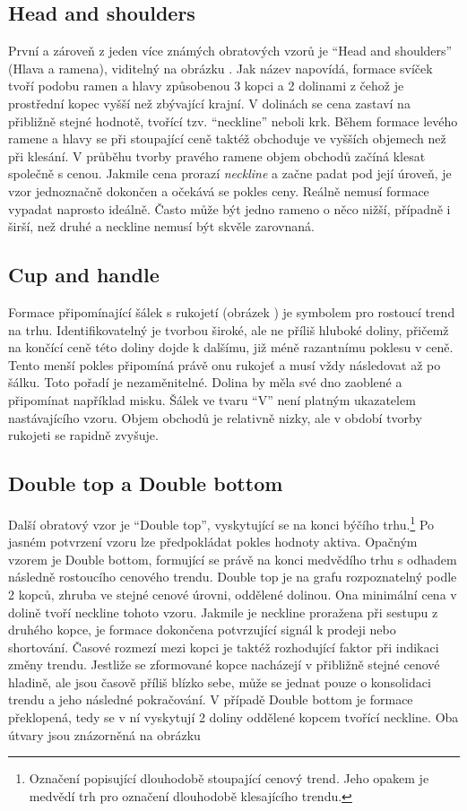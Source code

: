\subsection{Head and shoulders}
První a zároveň z jeden více známých obratových vzorů je \enquote{Head and shoulders} (Hlava a ramena), viditelný na obrázku \iffalse TODO: Dat obrazek \fi. Jak název napovídá, formace svíček tvoří podobu ramen a hlavy způsobenou
3 kopci a 2 dolinami z čehož je prostřední kopec vyšší než zbývající krajní. V dolinách se cena zastaví na přibližně stejné hodnotě, tvořící tzv. \enquote{neckline} neboli krk.
Během formace levého ramene a hlavy se při stoupající ceně taktéž obchoduje ve vyšších objemech než při klesání. V průběhu tvorby pravého ramene objem obchodů začíná klesat společně s cenou.
Jakmile cena prorazí \emph{neckline} a začne padat pod její úroveň, je vzor jednoznačně dokončen a očekává se pokles ceny. Reálně nemusí formace vypadat naprosto ideálně. Často
může být jedno rameno o něco nižší, případně i širší, než druhé a neckline nemusí být skvěle zarovnaná.


\subsection{Cup and handle}
Formace připomínající šálek s rukojetí (obrázek \iffalse TODO: Ref na obrazek \fi) je symbolem pro rostoucí trend na trhu. Identifikovatelný je tvorbou široké, ale ne příliš hluboké doliny, přičemž na končící ceně této doliny dojde k
dalšímu, již méně razantnímu poklesu v ceně. Tento menší pokles připomíná právě onu rukojeť a musí vždy následovat až po šálku. Toto pořadí je nezaměnitelné. Dolina by měla své dno
zaoblené a připomínat například misku. Šálek ve tvaru \enquote{V} není platným ukazatelem nastávajícího vzoru. Objem obchodů je relativně nizky, ale v období tvorby rukojeti se rapidně zvyšuje.


\subsection{Double top a Double bottom}
Další obratový vzor je \enquote{Double top}, vyskytující se na konci býčího trhu.\footnote{Označení popisující dlouhodobě stoupající cenový trend. Jeho opakem je medvědí trh pro označení
    dlouhodobě klesajícího trendu.} Po jasném potvrzení vzoru lze předpokládat pokles hodnoty aktiva. Opačným vzorem je Double bottom, formující se právě na konci medvědího trhu
s odhadem následně rostoucího cenového trendu. Double top je na grafu rozpoznatelný podle 2 kopců, zhruba ve stejné cenové úrovni, oddělené dolinou. Ona minimální cena v dolině
tvoří neckline tohoto vzoru. Jakmile je neckline proražena při sestupu z druhého kopce, je formace dokončena potvrzující signál k prodeji nebo shortování. Časové rozmezí mezi
kopci je taktéž rozhodující faktor při indikaci změny trendu. Jestliže se zformované kopce nacházejí v přibližně stejné cenové hladině, ale jsou časově příliš blízko sebe, může se jednat
pouze o konsolidaci trendu a jeho následné pokračování.
V případě Double bottom je formace překlopená, tedy se v ní vyskytují 2 doliny oddělené kopcem tvořící neckline. Oba útvary jsou znázorněná na obrázku \iffalse TODO: Pridat \ref{} na obrazek \fi



